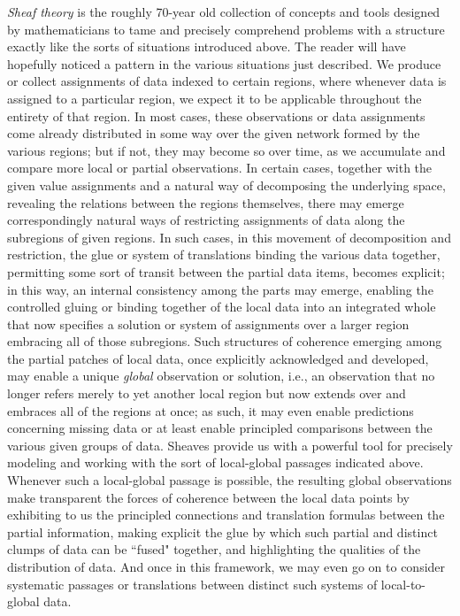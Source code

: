 \documentclass[11pt]{book}
\theoremstyle{definition}
\theoremstyle{definition}
\theoremstyle{definition}
\theoremstyle{theorem}
\theoremstyle{definition}
\begin{document}
	\textit{Sheaf theory} is the roughly 70-year old collection of concepts and tools designed by mathematicians to tame and precisely comprehend problems with a structure exactly like the sorts of situations introduced above. The reader will have hopefully noticed a pattern in the various situations just described. We produce or collect assignments of data indexed to certain regions, where whenever data is assigned to a particular region, we expect it to be applicable throughout the entirety of that region. In most cases, these observations or data assignments come already distributed  in some way over the given network formed by the various regions; but if not, they may become so over time, as we accumulate and compare more local or partial observations. In certain cases, together with the given value assignments and a natural way of decomposing the underlying space, revealing the relations between the regions themselves, there may emerge correspondingly natural ways of restricting assignments of data along the subregions of given regions. In such cases, in this movement of decomposition and restriction, the glue or system of translations binding the various data together, permitting some sort of transit between the partial data items, becomes explicit; in this way, an internal consistency among the parts may emerge, enabling the controlled gluing or binding together of the local data into an integrated whole that now specifies a solution or system of assignments over a larger region embracing all of those subregions. Such structures of coherence emerging among the partial patches of local data, once explicitly acknowledged and developed, may enable a unique \textit{global} observation or solution, i.e., an observation that no longer refers merely to yet another local region but now extends over and embraces all of the regions at once; as such, it may even enable predictions concerning missing data or at least enable principled comparisons between the various given groups of data. Sheaves provide us with a powerful tool for precisely modeling and working with the sort of local-global passages indicated above. Whenever such a local-global passage is possible, the resulting global observations make transparent the forces of coherence between the local data points by exhibiting to us the principled connections and translation formulas between the partial information, making explicit the glue by which such partial and distinct clumps of data can be ``fused" together, and highlighting the qualities of the distribution of data. And once in this framework, we may even go on to consider systematic passages or translations between distinct such systems of local-to-global data. \par 
\end{document}
